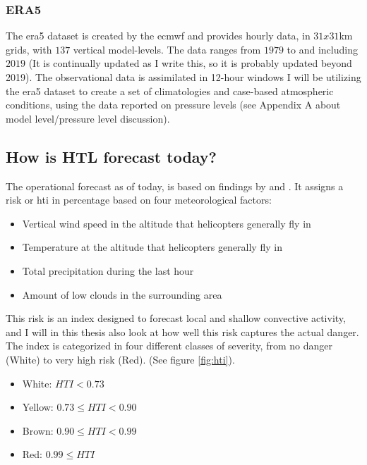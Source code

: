 \subsubsection{ERA5}
The \acrfull{era5} dataset is created by the \acrfull{ecmwf} and provides hourly data, in $31x31$km grids, with $137$ vertical model-levels. The data ranges from $1979$ to and including $2019$ (It is continually updated as I write this, so it is probably updated beyond 2019). The observational data is assimilated in 12-hour windows \cite{era5}
I will be utilizing the \acrshort{era5} dataset to create a set of climatologies and case-based atmospheric conditions, using the data reported on pressure levels (see Appendix A about model level/pressure level discussion). 
\subsection{How is HTL forecast today?}
The operational forecast as of today, is based on findings by \cite{hardwick} and \cite{wilkinson}. It assigns a risk or \acrfull{hti}  in percentage based on four meteorological factors:
\begin{itemize}
    \item Vertical wind speed in the altitude that helicopters generally fly in
    \item Temperature at the altitude that helicopters generally fly in
    \item Total precipitation during the last hour
    \item Amount of low clouds in the surrounding area
\end{itemize}
This risk is an index designed to forecast local and shallow convective activity, and I will in this thesis also look at how well this risk captures the actual danger.
The index is categorized in four different classes of severity, from no danger (White) to very high risk (Red). (See figure \ref{fig:hti}).
\begin{itemize}
    \item White: $HTI < 0.73$
    \item Yellow: $0.73 \leq HTI < 0.90 $
    \item Brown: $0.90 \leq HTI < 0.99 $
    \item Red: $0.99 \leq HTI $
\end{itemize}
